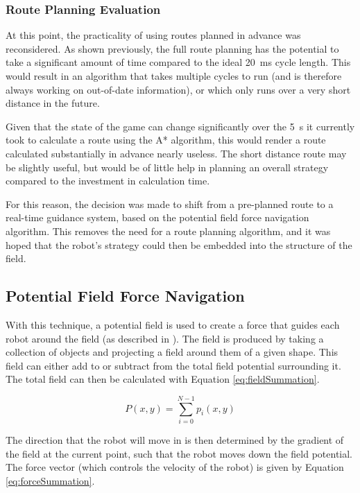 \documentclass[10pt]{article}
\begin{document}
\subsubsection{Route Planning Evaluation}

At this point, the practicality of using routes planned in advance was
reconsidered.  As shown previously, the full route planning has the potential to
take a significant amount of time compared to the ideal \SI{20}{\milli\second}
cycle length.  This would result in an algorithm that takes multiple cycles to
run (and is therefore always working on out-of-date information), or which only
runs over a very short distance in the future.

Given that the state of the game can change significantly over the
\SI{5}{\second} it currently took to calculate a route using the A* algorithm,
this would render a route calculated substantially in advance nearly useless. 
The short distance route may be slightly useful, but would be of little help in
planning an overall strategy compared to the investment in calculation time.

For this reason, the decision was made to shift from a pre-planned route to a
real-time guidance system, based on the potential field force navigation
algorithm. This removes the need for a route planning algorithm, and it was
hoped that the robot's strategy could then be embedded into the structure of the
field.

\subsection{Potential Field Force Navigation\label{sub:Potential-Field-Force}}

With this technique, a potential field is used to create a force that guides
each robot around the field (as described in
\cite{intelligentAlgorithmPathPlanning}). The field is produced by taking a
collection of objects and projecting a field around them of a given shape. This
field can either add to or subtract from the total field potential surrounding
it. The total field can then be calculated with Equation
\ref{eq:fieldSummation}.

\begin{equation}
P(x,y)=\sum_{i=0}^{N-1}p_{i}\left(x,y\right)\label{eq:fieldSummation}
\end{equation}

The direction that the robot will move in is then determined by the gradient of
the field at the current point, such that the robot moves down the field
potential. The force vector (which controls the velocity of the robot) is given
by Equation \ref{eq:forceSummation}.
\end{document}
